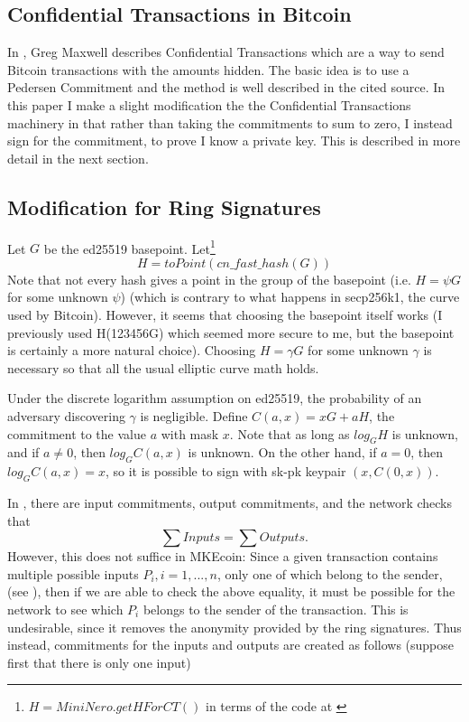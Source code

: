 \documentclass[12pt,oneside,english]{amsart}
\numberwithin{equation}{section}
\numberwithin{figure}{section}
\theoremstyle{plain}
\theoremstyle{plain}
\theoremstyle{remark}
\theoremstyle{plain}
\theoremstyle{remark}
\theoremstyle{remark}
\theoremstyle{plain}
\theoremstyle{definition}
\begin{document}
\subsection{Confidential Transactions in Bitcoin}

In \cite{GM}, Greg Maxwell describes Confidential Transactions which
are a way to send Bitcoin transactions with the amounts hidden. The
basic idea is to use a Pedersen Commitment and the method is well
described in the cited source. In this paper I make a slight modification
the the Confidential Transactions machinery in that rather than taking
the commitments to sum to zero, I instead sign for the commitment,
to prove I know a private key. This is described in more detail in
the next section. 


\subsection{Modification for Ring Signatures}

Let $G$ be the ed25519 basepoint. Let\footnote{$H=MiniNero.getHForCT()$ in terms of the code at \cite{Snoe}}
\[
H=toPoint\left(cn\_fast\_hash\left(G\right)\right)
\]
Note that not every hash gives a point in the group of the basepoint (i.e. $H=\psi G$ for some unknown $\psi$) (which is contrary to what happens in secp256k1, the curve used by Bitcoin). However, it seems that choosing the basepoint itself works (I previously used H(123456G) which seemed more secure to me, but the basepoint is certainly a more natural choice). 
Choosing $H = \gamma G$ for some unknown $\gamma$ is necessary so that all the usual elliptic curve math holds.

Under the discrete
logarithm assumption on ed25519, the probability of an adversary discovering $\gamma$
is negligible.  
Define $C\left(a,x\right)=xG+aH$, the commitment to the value $a$
with mask $x$. Note that as long as $log_{G}H$ is unknown, and if
$a\neq0$, then $log_{G}C\left(a,x\right)$ is unknown. On the other
hand, if $a=0$, then $log_{G}C\left(a,x\right)=x$, so it is possible
to sign with sk-pk keypair $\left(x,C\left(0,x\right)\right).$ 

In \cite{GM}, there are input commitments, output commitments, and
the network checks that 
\[
\sum Inputs=\sum Outputs.
\]
 However, this does not suffice in MKEcoin: Since a given transaction
contains multiple possible inputs $P_{i},i=1,...,n$, only one of
which belong to the sender, (see \cite[4.4]{CN}), then if we are
able to check the above equality, it must be possible for the network
to see which $P_{i}$ belongs to the sender of the transaction. This
is undesirable, since it removes the anonymity provided by the ring
signatures. Thus instead, commitments for the inputs and outputs are
created as follows (suppose first that there is only one input)
\end{document}
